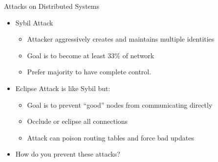 \documentclass[11pt]{beamer}
\begin{document}
\begin{frame}{Attacks on Distributed Systems}
	\begin{itemize}
		\item Sybil Attack
		\begin{itemize}
			\item Attacker aggressively creates and maintains multiple identities
			\item Goal is to become at least 33\% of network
			\item Prefer majority to have complete control.
		\end{itemize}
		\item Eclipse Attack is like Sybil but:
		\begin{itemize}
			\item Goal is to prevent ``good'' nodes from communicating directly
			\item Occlude or eclipse all connections
			\item Attack can poison routing tables and force bad updates
		\end{itemize}
		\item How do you prevent these attacks?
		
	\end{itemize}
	
\end{frame}
\end{document}
